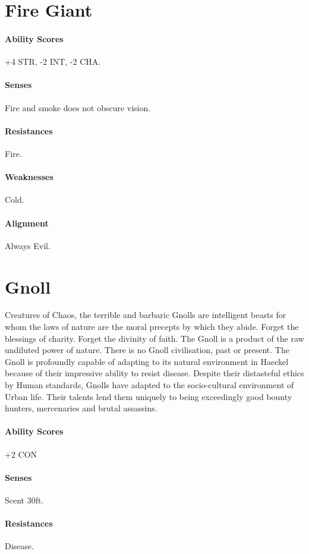 \begin{multicols}{2}
\section{Fire Giant}
    \paragraph{Ability Scores} +4 STR, -2 INT, -2 CHA.
    \paragraph{Senses} Fire and smoke does not obscure vision.
    \paragraph{Resistances} Fire.
    \paragraph{Weaknesses} Cold. 
    \paragraph{Alignment} Always Evil. 
\section{Gnoll} Creatures of Chaos, the terrible and barbaric Gnolls are intelligent beasts for whom the laws of nature are the moral precepts by which they abide. Forget the blessings of charity. Forget the divinity of faith. The Gnoll is a product of the raw undiluted power of nature. There is no Gnoll civilisation, past or present. The Gnoll is profoundly capable of adapting to its natural environment in Haeckel because of their impressive ability to resist disease. Despite their distasteful ethics by Human standards, Gnolls have adapted to the socio-cultural environment of Urban life. Their talents lend them uniquely to being exceedingly good bounty hunters, mercenaries and brutal assassins. 

    \paragraph{Ability Scores} +2 CON
    \paragraph{Senses} Scent 30ft.
    \paragraph{Resistances} Disease.

\end{multicols}
